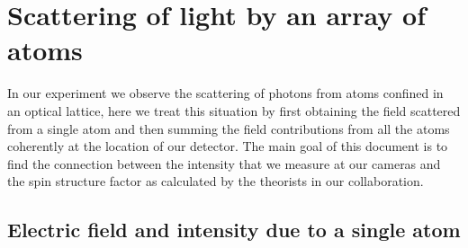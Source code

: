 \documentclass[11pt,letter]{article}
\begin{document}
\section{Scattering of light by an array of atoms}

In our experiment we observe the scattering of photons from atoms confined in
an optical lattice, here we treat this situation by first obtaining  the field
scattered from a single atom and then summing the field contributions from all
the atoms coherently at the location of our detector.  The main goal of this
document is to find the connection between the intensity that we measure at our
cameras and the spin structure factor as calculated by the theorists in our
collaboration.  

\subsection{Electric field and intensity due to a single atom}
\end{document}
